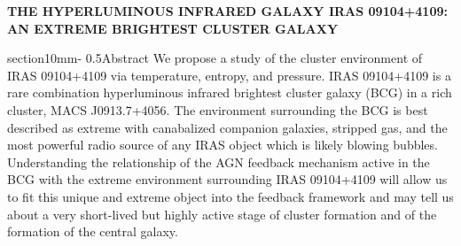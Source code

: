 \documentclass[letterpaper,12pt]{article}
\makeatletter
\renewcommand{\section}{\@startsection%
{section}{1}{0mm}{-\baselineskip}%
{0.5\baselineskip}{\normalfont\Large\bfseries}}%
\makeatother
\begin{document}
\pagestyle{plain}
\begin{center}
\bfseries\uppercase{The Hyperluminous Infrared Galaxy IRAS 09104+4109: An Extreme Brightest Cluster Galaxy}
\end{center}
\section{Abstract}
We propose a study of the cluster environment of IRAS 09104+4109 via
temperature, entropy, and pressure. IRAS
09104+4109 is a rare combination hyperluminous infrared
brightest cluster galaxy (BCG) in a rich cluster, MACS J0913.7+4056. The
environment surrounding the BCG is best described as extreme with
canabalized companion galaxies, stripped gas, and the most powerful radio
source of any IRAS object which is likely blowing
bubbles. Understanding the relationship of the AGN feedback mechanism active in the BCG with the extreme environment
surrounding IRAS 09104+4109 will allow us to fit this unique and
extreme object into the feedback framework and may tell us about a very short-lived but
highly active stage of cluster formation and of the formation of the
central galaxy.
\end{document}
